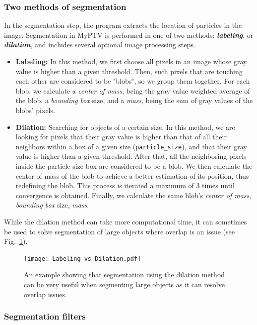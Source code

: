 \documentclass[10pt,a4paper]{article}
\begin{document}
\subsubsection{Two methods of segmentation} In the segmentation step, the program extracts the location of particles in the image. Segmentation in MyPTV is performed in one of two methods: \textbf{\textit{labeling}}, or \textbf{\textit{dilation}}, and includes several optional image processing steps. 
%
\begin{itemize}
	\item \textbf{Labeling:} In this method, we first choose all pixels in an image whose gray value is higher than a given threshold. Then, such pixels that are touching each other are considered to be "blobs", so we group them together. For each blob, we calculate a \textit{center of mass}, being the gray value weighted average of the blob, a \textit{bounding box} size, and a \textit{mass}, being the sum of gray values of the blobs' pixels.
	
	\item \textbf{Dilation:} Searching for objects of a certain size. In this method, we are looking for pixels that their gray value is higher than that of all their neighbors within a box of a given size (\texttt{particle\_size}), and that their gray value is higher than a given threshold. After that, all the neighboring pixels inside the particle size box are considered to be a blob. We then calculate the center of mass of the blob to achieve a better estimation of its position, thus redefining the blob. This process is iterated a maximum of 3 times until convergence is obtained. Finally, we calculate the same blob's \textit{center of mass}, \textit{bounding box} size, \textit{mass}.
\end{itemize}
%
While the dilation method can take more computational time, it can sometimes be used to solve segmentation of large objects where overlap is an issue (see Fig.~\ref{fig:Labeling_vs_Dilation}). 


\begin{figure}[h!]
	\centering
	\texttt{[image: Labeling\_vs\_Dilation.pdf]}
	\caption{An example showing that segmentation using the dilation method can be very useful when segmenting large objects as it can resolve overlap issues.\label{fig:Labeling_vs_Dilation}}
\end{figure}




\subsubsection{Segmentation filters}\label{sec:segment_filters}
\end{document}
